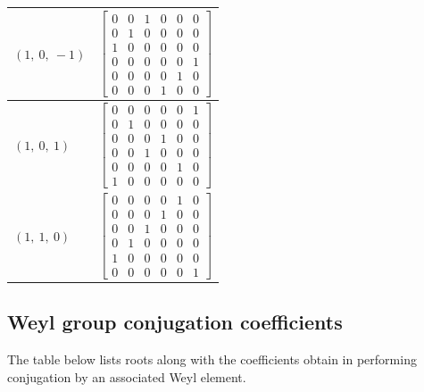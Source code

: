 \documentclass[11pt]{article}
\theoremstyle{definition}
\begin{document}
\begin{longtable}{|l|c|}
    \hline
    $\left( 1, \  0, \  -1\right)$ & ${\left[\begin{matrix}0 & 0 & 1 & 0 & 0 & 0\\0 & 1 & 0 & 0 & 0 & 0\\1 & 0 & 0 & 0 & 0 & 0\\0 & 0 & 0 & 0 & 0 & 1\\0 & 0 & 0 & 0 & 1 & 0\\0 & 0 & 0 & 1 & 0 & 0\end{matrix}\right]}$ \\
    \hline
    $\left( 1, \  0, \  1\right)$ & ${\left[\begin{matrix}0 & 0 & 0 & 0 & 0 & 1\\0 & 1 & 0 & 0 & 0 & 0\\0 & 0 & 0 & 1 & 0 & 0\\0 & 0 & 1 & 0 & 0 & 0\\0 & 0 & 0 & 0 & 1 & 0\\1 & 0 & 0 & 0 & 0 & 0\end{matrix}\right]}$ \\
    \hline
    $\left( 1, \  1, \  0\right)$ & ${\left[\begin{matrix}0 & 0 & 0 & 0 & 1 & 0\\0 & 0 & 0 & 1 & 0 & 0\\0 & 0 & 1 & 0 & 0 & 0\\0 & 1 & 0 & 0 & 0 & 0\\1 & 0 & 0 & 0 & 0 & 0\\0 & 0 & 0 & 0 & 0 & 1\end{matrix}\right]}$ \\
    \hline
\end{longtable}


\subsection{Weyl group conjugation coefficients}

The table below lists roots along with the coefficients obtain in performing conjugation by an associated Weyl element.

\bigskip
\end{document}
